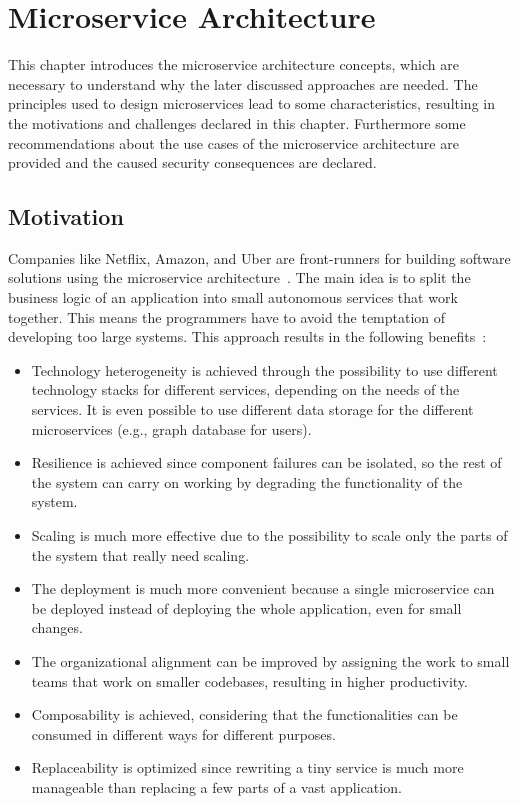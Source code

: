 \chapter{Microservice Architecture}
\label{cha:Microservice_Architecture}
This chapter introduces the microservice architecture concepts, which are necessary to understand why the later discussed approaches are needed.
The principles used to design microservices lead to some characteristics, resulting in the motivations and challenges declared in this chapter.
Furthermore some recommendations about the use cases of the microservice architecture are provided and the caused security consequences are declared.

\section{Motivation}
Companies like Netflix, Amazon, and Uber are front-runners for building software solutions using the microservice architecture~\cite{dias2020microservices}.
The main idea is to split the business logic of an application into small autonomous services that work together.
This means the programmers have to avoid the temptation of developing too large systems.
This approach results in the following benefits~\cite{newman2021building}: 
\begin{itemize}
    \item Technology heterogeneity is achieved through the possibility to use different technology stacks for different services, depending on the needs of the services.
		It is even possible to use different data storage for the different microservices (e.g., graph database for users).
    \item Resilience is achieved since component failures can be isolated, so the rest of the system can carry on working by degrading the functionality of the system. 
    \item Scaling is much more effective due to the possibility to scale only the parts of the system that really need scaling.
    \item The deployment is much more convenient because a single microservice can be deployed instead of deploying the whole application, even for small changes.
    \item The organizational alignment can be improved by assigning the work to small teams that work on smaller codebases, resulting in higher productivity.
    \item Composability is achieved, considering that the functionalities can be consumed in different ways for different purposes.
    \item Replaceability is optimized since rewriting a tiny service is much more manageable than replacing a few parts of a vast application.
\end{itemize}

